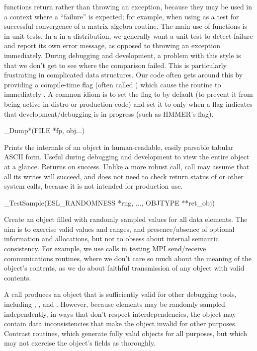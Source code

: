 \begin{sreapi}
 functions return  rather than
throwing an exception, because they may be used in a context where a
``failure'' is expected; for example, when using
 as a test for successful convergence of
a matrix algebra routine. The main use of  functions
is in unit tests. In a  in a distribution, we
generally want a unit test to detect failure and report its own error
message, as opposed to throwing an exception immediately. During
debugging and development, a problem with this style is that we don't
get to see where the comparison failed. This is particularly
frustrating in complicated data structures. Our code often gets around
this by providing a compile-time flag (often called )
which cause the routine to immediately . A common idiom
is to set the  flag to  by default (to
prevent it from being active in distro or production code) and set it
to  only when a flag indicates that development/debugging
is in progress (such as HMMER's  flag).


\hypertarget{ifc:Dump}
{\item[\_Dump*(FILE *fp, obj...)]}

Prints the internals of an object in human-readable, easily parsable
tabular ASCII form. Useful during debugging and development to view
the entire object at a glance. Returns  on success.
Unlike a more robust  call,  call may
assume that all its writes will succeed, and does not need to check
return status of  or other system calls, because it
is not intended for production use.


\hypertarget{ifc:TestSample}
{\item[\_TestSample(ESL_RANDOMNESS *rng, ..., OBJTYPE **ret_obj)]}

Create an object filled with randomly sampled values for all data
elements. The aim is to exercise valid values and ranges, and
presence/absence of optional information and allocations, but not to
obsess about internal semantic consistency. For example, we use
 calls in testing MPI send/receive
communications routines, where we don't care so much about the meaning
of the object's contents, as we do about faithful transmission of any
object with valid contents. 

A  call produces an object that is sufficiently
valid for other debugging tools, including ,
, and . However, because
elements may be randomly sampled independently, in ways that don't
respect interdependencies, the object may contain data inconsistencies
that make the object invalid for other purposes.  Contrast
 routines, which generate fully valid objects for
all purposes, but which may not exercise the object's fields as
thoroughly.

\end{sreapi}

